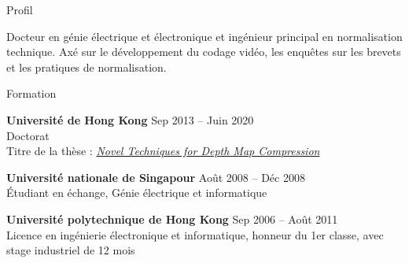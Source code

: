 \documentclass{resume} %
\begin{document}

\begin{rSection}{Profil}

Docteur en génie électrique et électronique et ingénieur principal en normalisation technique. Axé sur le développement du codage vidéo, les enquêtes sur les brevets et les pratiques de normalisation.

\end{rSection}


\begin{rSection}{Formation}

{\bf Université de Hong Kong} \hfill {Sep 2013 -- Juin 2020} \\ 
Doctorat \\
Titre de la thèse : \href{http://hdl.handle.net/10722/318421}{\textit{Novel Techniques for Depth Map Compression}}

{\bf Université nationale de Singapour} \hfill {Août 2008 -- Déc 2008} \\ 
Étudiant en échange, Génie électrique et informatique

{\bf Université polytechnique de Hong Kong} \hfill {Sep 2006 -- Août 2011} \\ 
Licence en ingénierie électronique et informatique, honneur du 1er classe, avec stage industriel de 12 mois

\end{rSection}

\end{document}
